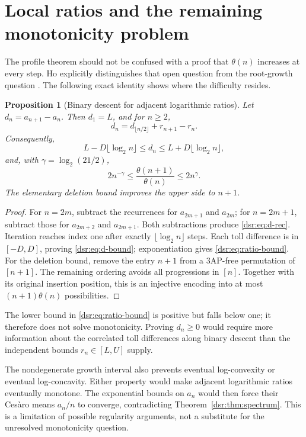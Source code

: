 \documentclass[11pt,a4paper]{article}
\numberwithin{equation}{section}
\newtheorem{proposition}[theorem]{Proposition}
\theoremstyle{definition}
\theoremstyle{remark}
\theoremstyle{definition}
\theoremstyle{plain}
\begin{document}
\section{Local ratios and the remaining monotonicity problem}
\label{dsr:sec:ratios}
The profile theorem should not be confused with a proof that $\theta(n)$
increases at every step. Ho explicitly distinguishes that open question from
the root-growth question \cite{Ho}. The following exact identity shows where
the difficulty resides.

\begin{proposition}[Binary descent for adjacent logarithmic ratios]
\label{dsr:prop:ratio}
Let $d_n=a_{n+1}-a_n$. Then $d_1=L$, and for $n\ge2$,
\begin{equation}
 d_n=d_{\lfloor n/2\rfloor}+r_{n+1}-r_n.
\label{dsr:eq:d-rec}
\end{equation}
Consequently,
\begin{equation}
 L-D\lfloor\log_2n\rfloor\le d_n
       \le L+D\lfloor\log_2n\rfloor,
\label{dsr:eq:d-bound}
\end{equation}
and, with $\gamma=\log_2(21/2)$,
\begin{equation}
 2n^{-\gamma}\le\frac{\theta(n+1)}{\theta(n)}\le2n^\gamma.
\label{dsr:eq:ratio-bound}
\end{equation}
The elementary deletion bound improves the upper side to $n+1$.
\end{proposition}
\begin{proof}
For $n=2m$, subtract the recurrences for $a_{2m+1}$ and $a_{2m}$; for
$n=2m+1$, subtract those for $a_{2m+2}$ and $a_{2m+1}$. Both subtractions
produce \eqref{dsr:eq:d-rec}. Iteration reaches index one after exactly
$\lfloor\log_2n\rfloor$ steps. Each toll difference is in $[-D,D]$, proving
\eqref{dsr:eq:d-bound}; exponentiation gives \eqref{dsr:eq:ratio-bound}.
For the deletion bound, remove the entry $n+1$ from a 3AP-free permutation
of $[n+1]$. The remaining ordering avoids all progressions in $[n]$. Together
with its original insertion position, this is an injective encoding into
at most $(n+1)\theta(n)$ possibilities.
\end{proof}

The lower bound in \eqref{dsr:eq:ratio-bound} is positive but falls below one; it
therefore does not solve monotonicity. Proving $d_n\ge0$ would require more
information about the correlated toll differences along binary descent than
the independent bounds $r_n\in[L,U]$ supply.

The nondegenerate growth interval also prevents eventual log-convexity or
eventual log-concavity. Either property would make adjacent logarithmic
ratios eventually monotone. The exponential bounds on $a_n$ would then
force their Ces\`aro means $a_n/n$ to converge, contradicting
Theorem~\ref{dsr:thm:spectrum}. This is a limitation of possible regularity
arguments, not a substitute for the unresolved monotonicity question.
\end{document}
